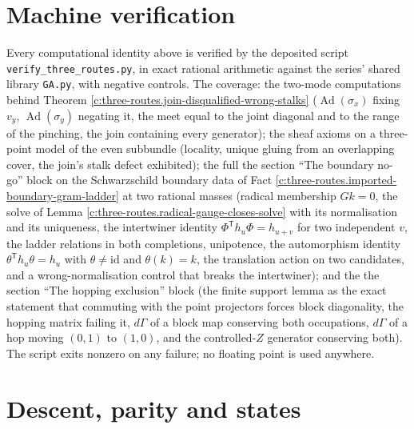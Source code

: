 \documentclass[11pt]{article}
\theoremstyle{definition}
\theoremstyle{plain}
\providecommand{\id}{}\renewcommand{\id}{\mathrm{id}}
\begin{document}
\section{Machine verification}

\label{c:note.three-routes.setting-machine-verification}
Every computational identity above is verified by the deposited script \texttt{verify\_three\_routes.py}, in exact rational arithmetic against the series' shared library \texttt{GA.py}, with negative controls. The coverage: the two-mode computations behind Theorem \ref{c:three-routes.join-disqualified-wrong-stalks} ($\operatorname{Ad}(\sigma_x)$ fixing $v_y$, $\operatorname{Ad}(\sigma_y)$ negating it, the meet equal to the joint diagonal and to the range of the pinching, the join containing every generator); the sheaf axioms on a three-point model of the even subbundle (locality, unique gluing from an overlapping cover, the join's stalk defect exhibited); the full the section ``The boundary no-go'' block on the Schwarzschild boundary data of Fact \ref{c:three-routes.imported-boundary-gram-ladder} at two rational masses (radical membership $Gk = 0$, the solve of Lemma \ref{c:three-routes.radical-gauge-closes-solve} with its normalisation and its uniqueness, the intertwiner identity $\Phi^{\mathsf{T}} h_u \Phi = h_{u+v}$ for two independent $v$, the ladder relations in both completions, unipotence, the automorphism identity $\theta^{\mathsf{T}} h_u \theta = h_u$ with $\theta \neq \id$ and $\theta(k) = k$, the translation action on two candidates, and a wrong-normalisation control that breaks the intertwiner); and the the section ``The hopping exclusion'' block (the finite support lemma as the exact statement that commuting with the point projectors forces block diagonality, the hopping matrix failing it, $d\Gamma$ of a block map conserving both occupations, $d\Gamma$ of a hop moving $(0,1)$ to $(1,0)$, and the controlled-$Z$ generator conserving both). The script exits nonzero on any failure; no floating point is used anywhere.

\section{Descent, parity and states}
\end{document}
